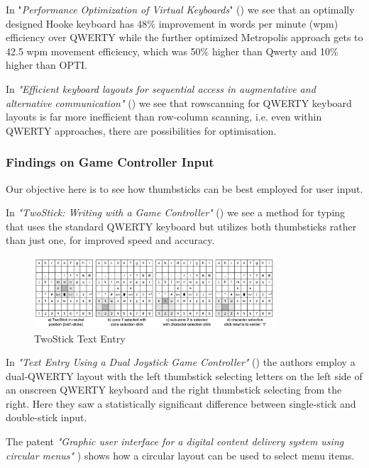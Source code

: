 \documentclass[
	letterpaper, %
]{jdf}
\begin{document}
In "\textit{Performance Optimization of Virtual Keyboards}" (\cite{zhai_hunter_smith_2002}) we see that an optimally designed Hooke keyboard has 48\% improvement in words per minute (wpm) efficiency over QWERTY while the further optimized Metropolis approach gets to 42.5 wpm movement efficiency, which was 50\% higher than Qwerty and 10\% higher than OPTI.

In \textit{"Efficient keyboard layouts for sequential access in augmentative and alternative communication"} (\cite{venkatagiri_1999}) we see that rowscanning for QWERTY keyboard layouts is far more inefficient than row-column scanning, i.e. even within QWERTY approaches, there are possibilities for optimisation.

\subsubsection{Findings on Game Controller Input}
Our objective here is to see how thumbsticks can be best employed for user input.

In \textit{"TwoStick: Writing with a Game Controller"} (\cite{twostick_2007}) we see a method for typing that uses the standard QWERTY keyboard but utilizes both thumbsticks rather than just one, for improved speed and accuracy.

\begin{figure}[h]
	\centering
	\includegraphics[width=9cm]{jdf-master/Figures/twostick.png}
	\caption{TwoStick Text Entry}
	\label{fig:twostick}
\end{figure}

In \textit{"Text Entry Using a Dual Joystick Game Controller"} (\cite{wilson_agrawala_2006}) the authors employ a dual-QWERTY layout with the left thumbstick selecting letters on the left side of an onscreen QWERTY keyboard and the right thumbstick selecting from the right. Here they saw a statistically significant difference between single-stick and double-stick input.

The patent \textit{"Graphic user interface for a digital content delivery system using circular menus"} \cite{eatsy_taplin_chechik_nelson_2002}) shows how a circular layout can be used to select menu items. 
\end{document}

